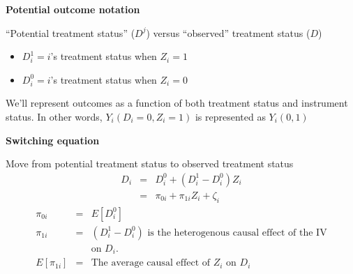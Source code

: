 \documentclass[notes=show]{beamer}
\begin{document}
\begin{frame}[plain]

	\begin{center}
	\textbf{Potential outcome notation}
	\end{center}
	
``Potential treatment status'' ($D^j$) versus ``observed'' treatment status ($D$)
		\begin{itemize}
		\item $D^1_{i} = i$'s treatment status when $Z_i=1$
		\item $D^0_{i} = i$'s treatment status when $Z_i=0$
		\end{itemize}
We'll represent outcomes as a function of both treatment status and instrument status. In other words, $Y_i(D_i=0,Z_i=1)$ is represented as $Y_i(0,1)$

\end{frame}


\begin{frame}[plain]
\begin{center}
\textbf{Switching equation}
\end{center}

Move from potential treatment status to observed treatment status
			\begin{eqnarray*}
			D_i&=&D^0_{i} + (D^1_{i} - D^0_{i})Z_i \\
			&=&\pi_{0i} + \pi_{1i}Z_i + \zeta_i
			\end{eqnarray*}
			\begin{eqnarray*}
			\pi_{0i} &=& E[D^0_{i}] \\
			\pi_{1i} &=& (D^1_{i} - D^0_{i}) \text{ is the heterogenous causal effect of the IV} \\
			&&\text{on }D_i. \\
			E[\pi_{1i}] &=& \text{The average causal effect of }Z_i\text{ on }D_i
			\end{eqnarray*}

\end{frame}



\end{document}
